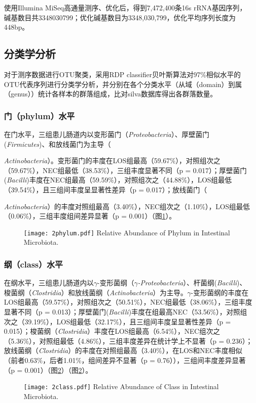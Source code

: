   使用Illumina MiSeq高通量测序、优化后，得到7,472,400条16s rRNA基因序列，碱基数目共3348030799；优化碱基数目为3348,030,799，优化平均序列长度为448bp。
  \subsection{分类学分析}
  对于测序数据进行OTU聚类，采用RDP classifier贝叶斯算法对97\%相似水平的OTU代表序列进行分类学分析，并分别在各个分类水平（从域（domain）到属（genus））统计各样本的群落组成，比对silva数据库得出各群落数量。
    \subsubsection{门（phylum）水平}
    在门水平，三组患儿肠道内以变形菌门（\textit{Proteobacteria}）、厚壁菌门(\textit{Firmicutes})、和放线菌门为主导（{\textit{Actinobacteria}）。变形菌门的丰度在LOS组最高（59.67\%），对照组次之（59.67\%），NEC组最低（38.53\%），三组丰度显著不同（p = 0.017）；厚壁菌门(\textit{Bacilli})丰度在NEC组最高（59.59\%），对照组次之（44.88\%），LOS组最低（39.54\%），且三组间丰度呈显著性差异（p = 0.017）；放线菌门（{\textit{Actinobacteria}）的丰度对照组最高（3.40\%），NEC组次之（1.10\%），LOS组最低（0.06\%），三组丰度组间差异显著（p = 0.001）（图\ref{fig:2phylum}）。
      \begin{figure}[!htp]
        \centering
        \texttt{[image: 2phylum.pdf]}
          {Relative Abundance of Phylum in Intestinal Microbiota.}
        \label{fig:2phylum}
      \end{figure}

    \subsubsection{纲（class）水平}
    在纲水平，三组患儿肠道内以$\gamma$-变形菌纲（\textit{$\gamma$-Proteobacteria}）、杆菌纲(\textit{Bacilli})、梭菌纲（\textit{Clostridia}）和放线菌纲（\textit{Actinobacteria}）为主导。$\gamma$-变形菌纲的丰度在LOS组最高（59.57\%），对照组次之（50.51\%），NEC组最低（38.06\%），三组丰度显著不同（p = 0.013）；厚壁菌门(\textit{Bacilli})丰度在组最高NEC（53.56\%），对照组次之（39.19\%），LOS组最低（32.17\%），且三组间丰度呈显著性差异（p = 0.015）；梭菌纲（\textit{Clostridia}）丰度在LOS组最高（6.54\%），NEC组次之（5.36\%），对照组最低（4.86\%），三组丰度差异在统计学上不显著（p = 0.236）；放线菌纲（\textit{Clostridia}）的丰度在对照组最高（3.40\%），在LOS和NEC丰度相似（前者0.63\%，后者1.01\%，组间差异不显著（p = 0.76）），三组间丰度差异显著（p = 0.001）（图\ref{fig:2class}）（图\ref{fig:2class}）。
      \begin{figure}[!htp]
        \centering
        \texttt{[image: 2class.pdf]}
          {Relative Abundance of Class in Intestinal Microbiota.}
        \label{fig:2class}
      \end{figure}

}}
